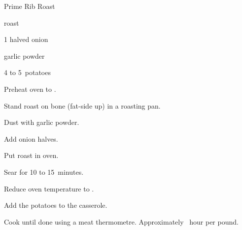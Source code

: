\begin{recipe}{Prime Rib Roast}{}{}

\begin{ingredients}
\item roast
\item 1 halved onion
\item garlic powder
\item 4 to 5~potatoes
\end{ingredients}

\begin{directions}
\item Preheat oven to .
\item Stand roast on bone (fat-side up) in a roasting pan.
\item Dust with garlic powder.
\item Add onion halves.
\item Put roast in oven.
\item Sear for 10 to 15~minutes.
\item Reduce oven temperature to .
\item Add the potatoes to the casserole.
\item Cook until done using a meat thermometre. Approximately \half~hour per pound.
\end{directions}
\end{recipe}
